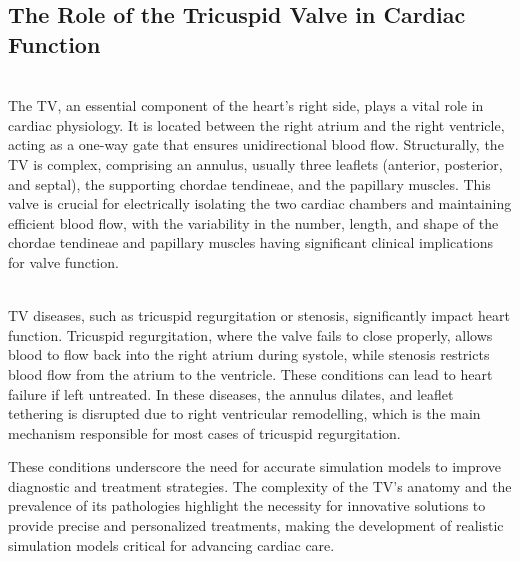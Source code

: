 
\subsection{The Role of the Tricuspid Valve in Cardiac Function}
\\
The \gls{TV}, an essential component of the heart's right side, plays a vital role in cardiac physiology. It is located between the right atrium and the right ventricle, acting as a one-way gate that ensures unidirectional blood flow. Structurally, the \gls{TV} is complex, comprising an annulus, usually three leaflets (anterior, posterior, and septal), the supporting chordae tendineae, and the papillary muscles. This valve is crucial for electrically isolating the two cardiac chambers and maintaining efficient blood flow, with the variability in the number, length, and shape of the chordae tendineae and papillary muscles having significant clinical implications for valve function. 

\\
\gls{TV} diseases, such as tricuspid regurgitation or stenosis, significantly impact heart function. Tricuspid regurgitation, where the valve fails to close properly, allows blood to flow back into the right atrium during systole, while stenosis restricts blood flow from the atrium to the ventricle. These conditions can lead to heart failure if left untreated. In these diseases, the annulus dilates, and leaflet tethering is disrupted due to right ventricular remodelling, which is the main mechanism responsible for most cases of tricuspid regurgitation.

These conditions underscore the need for accurate simulation models to improve diagnostic and treatment strategies. The complexity of the \gls{TV}'s anatomy and the prevalence of its pathologies highlight the necessity for innovative solutions to provide precise and personalized treatments, making the development of realistic simulation models critical for advancing cardiac care.


